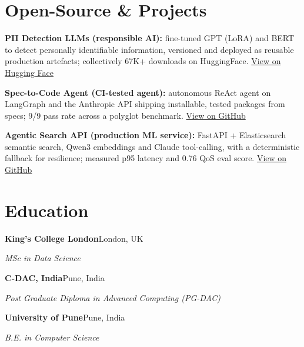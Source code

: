 \documentclass[10pt,a4paper]{article}
\begin{document}
\section{Open-Source \& Projects}
\begin{tight}
  \item \textbf{PII Detection LLMs (responsible AI):} fine-tuned GPT (LoRA) and BERT to detect personally identifiable information, versioned and deployed as reusable production artefacts; collectively 67K+ downloads on HuggingFace. \href{https://huggingface.co/ab-ai/pii_model}{View on Hugging Face}
  \item \textbf{Spec-to-Code Agent (CI-tested agent):} autonomous ReAct agent on LangGraph and the Anthropic API shipping installable, tested packages from specs; 9/9 pass rate across a polyglot benchmark. \href{https://github.com/abhijeetscode/Spec-to-Code-Agent}{View on GitHub}
  \item \textbf{Agentic Search API (production ML service):} FastAPI + Elasticsearch semantic search, Qwen3 embeddings and Claude tool-calling, with a deterministic fallback for resilience; measured p95 latency and 0.76 QoS eval score. \href{https://github.com/abhijeetscode/search-agent}{View on GitHub}
\end{tight}

\section{Education}
{\color{company}\bfseries King's College London}\hfill {\color{muted}London, UK}\par
{\itshape MSc in Data Science}\par\vspace{2pt}
{\color{company}\bfseries C-DAC, India}\hfill {\color{muted}Pune, India}\par
{\itshape Post Graduate Diploma in Advanced Computing (PG-DAC)}\par\vspace{2pt}
{\color{company}\bfseries University of Pune}\hfill {\color{muted}Pune, India}\par
{\itshape B.E. in Computer Science}\par
\end{document}
